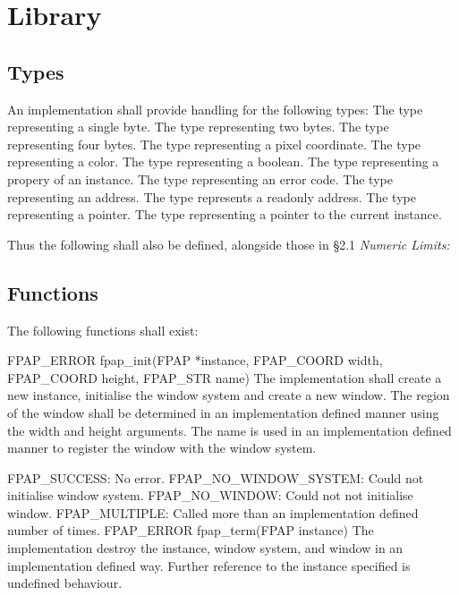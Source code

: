 \chapter{Library}

\section{Types}

\noindent An implementation shall provide handling for the following types:
 The type representing a single byte.
 The type representing two bytes.
 The type representing four bytes.
 The type representing a pixel coordinate.
 The type representing a color.
 The type representing a boolean.
 The type representing a propery of an instance.
 The type representing an error code.
 The type representing an address.
 The type represents a readonly address.
 The type representing a pointer.
 The type representing a pointer to the current instance.

\noindent Thus the following shall also be defined, alongside those in \S 2.1
\sl Numeric Limits\rm:


\section{Functions}

\noindent The following functions shall exist:

{}
\code
FPAP\_ERROR fpap\_init(FPAP *instance, FPAP\_COORD width, FPAP\_COORD height,\cr
\qquad FPAP\_STR name)\cr
\ecode
\noindent The implementation shall create a new instance, initialise the
window system and create a new window. The region of the window shall be
determined in an implementation defined manner using the width and height
arguments. The name is used in an implementation defined manner to register
the window with the window system.

\error FPAP\_SUCCESS: No error.
\error FPAP\_NO\_WINDOW\_SYSTEM: Could not initialise window system.
\error FPAP\_NO\_WINDOW: Could not not initialise window.
\error FPAP\_MULTIPLE: Called more than an implementation defined number of
times.
\code
FPAP\_ERROR fpap\_term(FPAP instance)\cr
\ecode
\noindent The implementation destroy the instance, window system, and window
in an implementation defined way. Further reference to the instance specified
is undefined behaviour.


